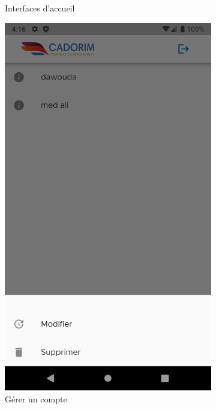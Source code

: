 \begin{itemize}[label=$\ast$]
\begin{figure}
\begin{subfigure}[b]{0.3\textwidth}
		\caption{Interfaces d’accueil}
		\label{fig:y equals x}
	\end{subfigure}
	\hfill
	\begin{subfigure}[b]{0.3\textwidth}
		\centering
		\includegraphics[width=\textwidth]{./Template LaTeX/Images/From_emu/A_update_modif.png}
		\caption{Gérer un compte}
		\label{fig:three sin x}
	\end{subfigure}
	\hfill
	\begin{subfigure}[b]{0.3\textwidth}
		\centering

\end{subfigure}
\end{figure}
\end{itemize}
